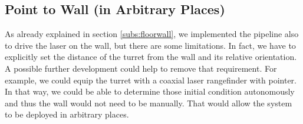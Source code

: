 \subsection{Point to Wall (in Arbitrary Places)}
As already explained in section \ref{subs:floorwall}, we implemented the pipeline also to drive the laser on the wall, but there are some limitations. In fact, we have to explicitly set the distance of the turret from the wall and its relative orientation. A possible further development could help to remove that requirement. For example, we could equip the turret with a coaxial laser rangefinder with pointer. In that way, we could be able to determine those initial condition autonomously and thus the wall would not need to be  manually. That would allow the system to be deployed in arbitrary places.